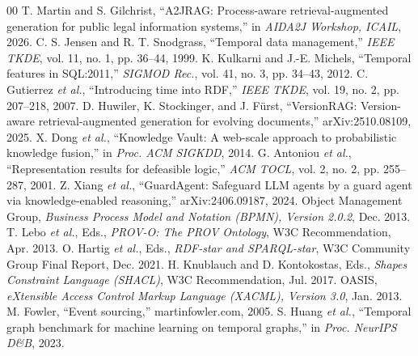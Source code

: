 \documentclass[conference]{IEEEtran}
\begin{document}
\begin{thebibliography}{00}
 T. Martin and S. Gilchrist, ``A2JRAG: Process-aware retrieval-augmented generation for public legal information systems,'' in \emph{AIDA2J Workshop, ICAIL}, 2026.
 C. S. Jensen and R. T. Snodgrass, ``Temporal data management,'' \emph{IEEE TKDE}, vol. 11, no. 1, pp. 36--44, 1999.
 K. Kulkarni and J.-E. Michels, ``Temporal features in SQL:2011,'' \emph{SIGMOD Rec.}, vol. 41, no. 3, pp. 34--43, 2012.
 C. Gutierrez \emph{et al.}, ``Introducing time into RDF,'' \emph{IEEE TKDE}, vol. 19, no. 2, pp. 207--218, 2007.
 D. Huwiler, K. Stockinger, and J. F\"urst, ``VersionRAG: Version-aware retrieval-augmented generation for evolving documents,'' arXiv:2510.08109, 2025.
 X. Dong \emph{et al.}, ``Knowledge Vault: A web-scale approach to probabilistic knowledge fusion,'' in \emph{Proc. ACM SIGKDD}, 2014.
 G. Antoniou \emph{et al.}, ``Representation results for defeasible logic,'' \emph{ACM TOCL}, vol. 2, no. 2, pp. 255--287, 2001.
 Z. Xiang \emph{et al.}, ``GuardAgent: Safeguard LLM agents by a guard agent via knowledge-enabled reasoning,'' arXiv:2406.09187, 2024.
 Object Management Group, \emph{Business Process Model and Notation (BPMN), Version 2.0.2}, Dec. 2013.
 T. Lebo \emph{et al.}, Eds., \emph{PROV-O: The PROV Ontology}, W3C Recommendation, Apr. 2013.
 O. Hartig \emph{et al.}, Eds., \emph{RDF-star and SPARQL-star}, W3C Community Group Final Report, Dec. 2021.
 H. Knublauch and D. Kontokostas, Eds., \emph{Shapes Constraint Language (SHACL)}, W3C Recommendation, Jul. 2017.
 OASIS, \emph{eXtensible Access Control Markup Language (XACML), Version 3.0}, Jan. 2013.
 M. Fowler, ``Event sourcing,'' martinfowler.com, 2005.
 S. Huang \emph{et al.}, ``Temporal graph benchmark for machine learning on temporal graphs,'' in \emph{Proc. NeurIPS D\&B}, 2023.
\end{thebibliography}
\end{document}
